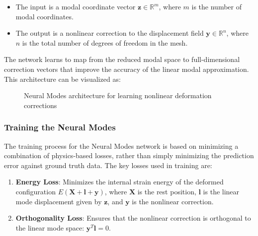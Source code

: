 \begin{itemize}
    \item The input is a modal coordinate vector \( \bm{z} \in \mathbb{R}^m \), where $m$ is the number of modal coordinates.
    \item The output is a nonlinear correction to the displacement field \( \bm{y} \in \mathbb{R}^n \), where $n$ is the total number of degrees of freedom in the mesh.
\end{itemize}

The network learns to map from the reduced modal space to full-dimensional correction vectors that improve the accuracy of the linear modal approximation. This architecture can be visualized as:

\begin{figure}
    \centering
    \caption{Neural Modes architecture for learning nonlinear deformation corrections}
    \label{fig:neural_modes_arch}
\end{figure}

\subsubsection{Training the Neural Modes}
The training process for the Neural Modes network is based on minimizing a combination of physics-based losses, rather than simply minimizing the prediction error against ground truth data. The key losses used in training are:

\begin{enumerate}
    \item \textbf{Energy Loss}: Minimizes the internal strain energy of the deformed configuration $E(\bm{X} + \bm{l} + \bm{y})$, where $\bm{X}$ is the rest position, $\bm{l}$ is the linear mode displacement given by $\bm{z}$, and $\bm{y}$ is the nonlinear correction.
    
    \item \textbf{Orthogonality Loss}: Ensures that the nonlinear correction is orthogonal to the linear mode space: $\bm{y}^T \bm{l} = 0$.
    
\end{enumerate}

